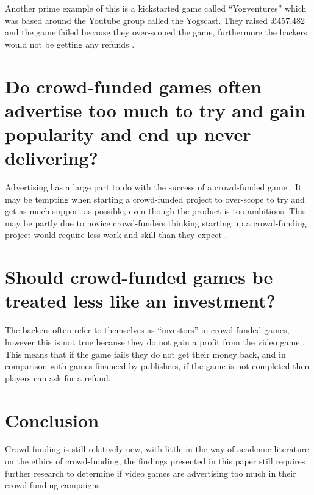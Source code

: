 \documentclass{scrartcl}
\begin{document}
Another prime example of this is a kickstarted game called ``Yogventures'' which was based around the Youtube group called the Yogscast. They raised \pounds457,482 and the game failed because they over-scoped the game, furthermore the backers would not be getting any refunds \cite{YogventuresFailure}.


\section{ Do crowd-funded games often advertise too much to try and gain popularity and end up never delivering?}

Advertising has a large part to do with the success of a crowd-funded game \cite{qiu2013, Greenberg:2013}.  It may be tempting when starting a crowd-funded project to over-scope to try and get as much support as possible, even though the product is too ambitious. This may be partly due to novice crowd-funders thinking starting up a crowd-funding project would require less work and skill than they expect \cite{xu2014show}.

\section{Should crowd-funded games be treated less like an investment?}

The backers often refer to themselves as ``investors'' in crowd-funded games, however this is not true because they do not gain a profit from the video game \cite{Harris:2013}. This means that if the game fails they do not get their money back, and in comparison with games financed by publishers, if the game is not completed then players can ask for a refund.

\section{Conclusion}

Crowd-funding is still relatively new, with little in the way of academic literature on the ethics of crowd-funding, the findings presented in this paper still requires further research to determine if video games are advertising too much in their crowd-funding campaigns.




\end{document}
